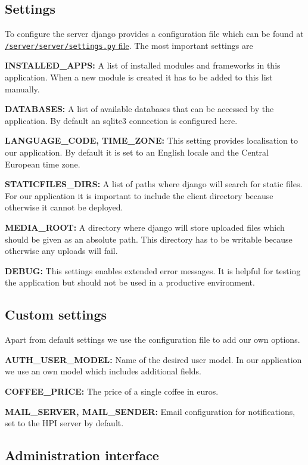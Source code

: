 \subsection{Settings}\label{settings}

To configure the server django provides a configuration file which can
be found at
\href{../../server/server/settings.py}{\texttt{/server/server/settings.py}
file}. The most important settings are

\textbf{INSTALLED\_APPS:} A list of installed modules and frameworks in
this application. When a new module is created it has to be added to
this list manually.

\textbf{DATABASES:} A list of available databases that can be accessed
by the application. By default an sqlite3 connection is configured here.

\textbf{LANGUAGE\_CODE, TIME\_ZONE:} This setting provides localisation
to our application. By default it is set to an English locale and the
Central European time zone.

\textbf{STATICFILES\_DIRS:} A list of paths where django will search for
static files. For our application it is important to include the client
directory because otherwise it cannot be deployed.

\textbf{MEDIA\_ROOT:} A directory where django will store uploaded files
which should be given as an absolute path. This directory has to be
writable because otherwise any uploads will fail.

\textbf{DEBUG:} This settings enables extended error messages. It is
helpful for testing the application but should not be used in a
productive environment.

\subsection{Custom settings}\label{custom-settings}

Apart from default settings we use the configuration file to add our own
options.

\textbf{AUTH\_USER\_MODEL:} Name of the desired user model. In our
application we use an own model which includes additional fields.

\textbf{COFFEE\_PRICE:} The price of a single coffee in euros.

\textbf{MAIL\_SERVER, MAIL\_SENDER:} Email configuration for
notifications, set to the HPI server by default.

\subsection{Administration interface}\label{administration-interface}

